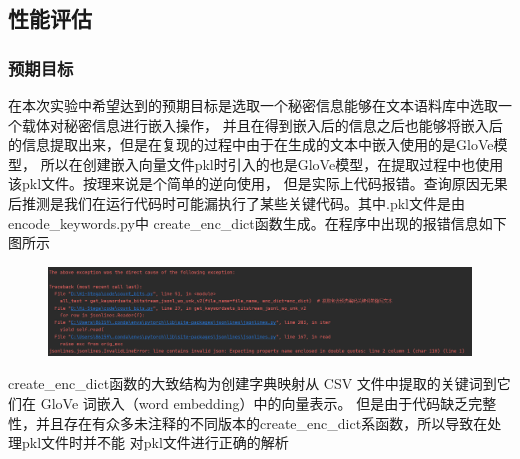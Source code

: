 \documentclass[a4paper,11pt,UTF8]{ctexart}
\newcommand{\bottomcaption}{%
\setlength{\abovecaptionskip}{6pt}%
\setlength{\belowcaptionskip}{6pt}%
\caption}
\newcommand{\xiaowuhao}{\fontsize{9pt}{\baselineskip}\selectfont}   %
\begin{document}
  \subsection{性能评估}

    \subsubsection{预期目标}
      在本次实验中希望达到的预期目标是选取一个秘密信息能够在文本语料库中选取一个载体对秘密信息进行嵌入操作，
      并且在得到嵌入后的信息之后也能够将嵌入后的信息提取出来，但是在复现的过程中由于在生成的文本中嵌入使用的是GloVe模型，
      所以在创建嵌入向量文件pkl时引入的也是GloVe模型，在提取过程中也使用该pkl文件。按理来说是个简单的逆向使用，
      但是实际上代码报错。查询原因无果后推测是我们在运行代码时可能漏执行了某些关键代码。其中.pkl文件是由encode\_keywords.py中
      create\_enc\_dict函数生成。在程序中出现的报错信息如下图所示
      \begin{figure}[H]
        \centering
        \includegraphics[width=13cm]{pkl解析报错.png}
        \bottomcaption{\xiaowuhao{pkl解析报错信息}}
      \end{figure}
      create\_enc\_dict函数的大致结构为创建字典映射从 CSV 文件中提取的关键词到它们在 GloVe 词嵌入（word embedding）中的向量表示。
      但是由于代码缺乏完整性，并且存在有众多未注释的不同版本的create\_enc\_dict系函数，所以导致在处理pkl文件时并不能
      对pkl文件进行正确的解析
  
\end{document}
